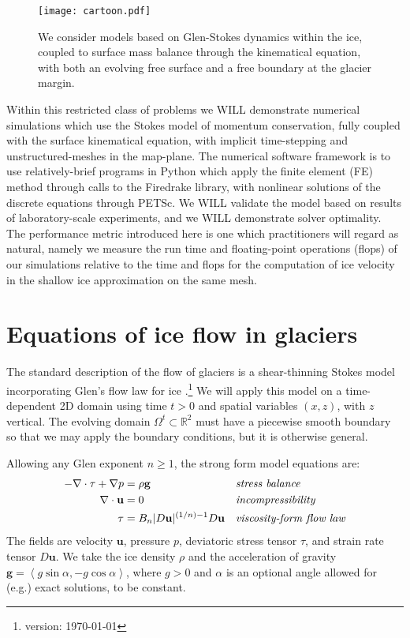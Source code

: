 \documentclass[letterpaper,final,12pt,reqno]{amsart}
\newcommand{\RR}{\mathbb{R}}
\newcommand{\bg}{\mathbf{g}}
\newcommand{\bu}{\mathbf{u}}
\begin{document}
\begin{figure}[h]
\begin{center}
\texttt{[image: cartoon.pdf]}
\end{center}

\caption{We consider models based on Glen-Stokes dynamics within the ice, coupled to surface mass balance through the kinematical equation, with both an evolving free surface and a free boundary at the glacier margin.}
\label{fig:cartoon}
\end{figure}

Within this restricted class of problems we WILL demonstrate numerical simulations which use the Stokes model of momentum conservation, fully coupled with the surface kinematical equation, with implicit time-stepping and unstructured-meshes in the map-plane.  The numerical software framework is to use relatively-brief programs in Python which apply the finite element (FE) method through calls to the Firedrake library, with nonlinear solutions of the discrete equations through PETSc.  We WILL validate the model based on results of laboratory-scale experiments, and we WILL demonstrate solver optimality.  The performance metric introduced here is one which practitioners will regard as natural, namely we measure the run time and floating-point operations (flops) of our simulations relative to the time and flops for the computation of ice velocity in the shallow ice approximation on the same mesh.

\section{Equations of ice flow in glaciers} \label{sec:strongform}

The standard description of the flow of glaciers is a shear-thinning Stokes model  incorporating Glen's flow law for ice \cite{GreveBlatter2009,JouvetRappaz2011}.\footnote{version: \today}  We will apply this model on a time-dependent 2D domain using time $t>0$ and spatial variables $(x,z)$, with $z$ vertical.  The evolving domain $\Omega^t \subset \RR^2$ must have a piecewise smooth boundary so that we may apply the boundary conditions, but it is otherwise general.

Allowing any Glen exponent $n\ge 1$, the strong form model equations are:
\begin{align}
- \nabla \cdot \tau + \nabla p &= \rho \bg &&\text{\emph{stress balance}} \label{forcebalance} \\
\nabla \cdot \bu &= 0 &&\text{\emph{incompressibility}} \label{incompressible} \\
\tau &= B_n |D\bu|^{(1/n) - 1} D\bu  &&\text{\emph{viscosity-form flow law}} \label{viscflowlaw}
\end{align}
The fields are velocity $\bu$, pressure $p$, deviatoric stress tensor $\tau$, and strain rate tensor $D\bu$.  We take the ice density $\rho$ and the acceleration of gravity $\bg = \left<g\sin\alpha,-g\cos\alpha\right>$, where $g>0$ and $\alpha$ is an optional angle allowed for (e.g.) exact solutions, to be constant.
\end{document}
